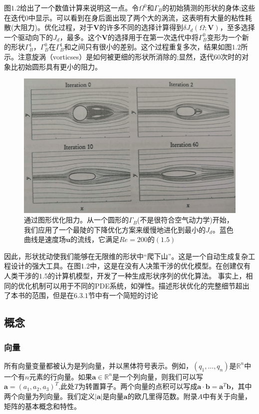 \documentclass[12pt,a4paper]{article}
\numberwithin{equation}{section}
\begin{document}
图$1.2$给出了一个数值计算来说明这一点。令$\Omega ^0$和$\Gamma _B$的初始猜测的形状的身体;这些在迭代$0$中显示。可以看到在身后面出现了两个大的涡流，这表明有大量的粘性耗散(大阻力)。优化过程，对于$\mathbf{V}$的许多不同的选择计算得到$\delta J_d(\Omega;\mathbf{V})$，至多选择一个驱动向下的$J_d$，最多。这个$\mathbf{V}$的选择用于在第一次迭代中将$\Gamma _B^0$变形为一个新的形状$\Gamma _B^1$，$\Gamma _B^0$在$\Gamma _B^1$和之间只有很小的差别。这个过程重复多次，结果如图$1.2$所示。注意旋涡（vorticses）是如何被更细的形状所消除的;显然，迭代$60$次时的对象比初始圆形具有更小的阻力。 
\begin{figure}[H]
\centering
\includegraphics[scale=0.5]{./figures/12.png}
\caption{通过图形优化阻力。从一个圆形的$\Gamma _B$(不是很符合空气动力学)开始，我们应用了一个最陡的下降优化方案来缓慢地进化到最小的$J_d$。蓝色曲线是速度场$\mathbf{u}$的流线，它满足$Re=200$的$(1.5)$
}
\end{figure}

因此，形状扰动使我们能够在无限维的形状中“爬下山”。这是一个自动生成复杂工程设计的强大工具。在图$1.2$中，这是在没有人决策干涉的优化模型。在创建仅有人类干涉的$1.5$的计算机模型，开发了一种生成形状序列的优化算法。
事实上，相同的优化机制可以用于不同的PDE系统，如弹性。描述形状优化的完整细节超出了本书的范围，但是在$6.3.1$节中有一个简短的讨论

\subsection{概念}
\subsubsection{向量}
所有向量变量都被认为是列向量，并以黑体符号表示。例如，$(q_1,...,q_n)$是$\mathbb{R}^n$中一个有$n$元素的行向量。如果$\mathbf{a}\in \mathbb{R}^n$是一个列向量，则我们可以写$\mathbf{a}=(a_1,a_2,a_3)^T$,此处$T$为转置算子。两个向量的点积可以写成$\mathbf{a} \cdot \mathbf{b}=\mathbf{a}^{T} \mathbf{b}$，其中两个向量为列向量。我们定义$|\mathbf{a}|$是向量$\mathbf{a}$的欧几里得范数。附录$A$中有关于向量，矩阵的基本概念和特性。
\end{document}

